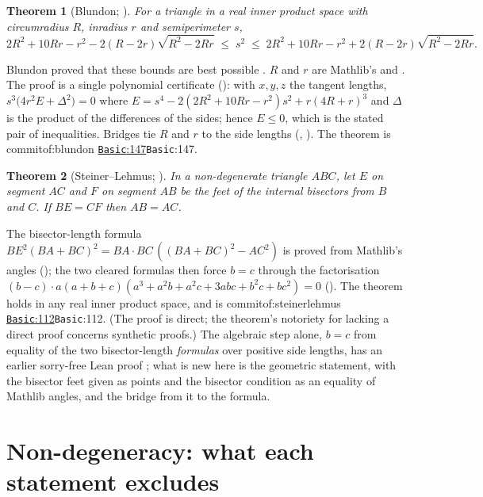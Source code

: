 \documentclass[11pt]{article}
\newtheorem{theorem}{Theorem}
\theoremstyle{definition}
\theoremstyle{remark}
\newcommand{\commitof}[1]{\csname commitof:#1\endcsname}
\newcommand{\repo}[1]{https://github.com/jpbald93/#1}
\newcommand{\src}[4]{\ifcsname commitof:#1\endcsname
  \href{\repo{#1}/blob/\commitof{#1}/#2/#3.lean\#L#4}{\texttt{#3}:#4}\else\texttt{#3}:#4\fi}
\begin{document}
\begin{theorem}[Blundon; ]\label{thm:blundon}
For a triangle in a real inner product space with circumradius $R$, inradius $r$ and semiperimeter $s$,
\[
2R^2+10Rr-r^2-2(R-2r)\sqrt{R^2-2Rr}\;\le\; s^2\;\le\;2R^2+10Rr-r^2+2(R-2r)\sqrt{R^2-2Rr}.
\]
\end{theorem}
Blundon proved that these bounds are best possible \cite{blundon1965}. $R$ and $r$ are Mathlib's
 and . The proof is a single
polynomial certificate (): with $x,y,z$ the tangent lengths,
$s^3\bigl(4r^2E+\Delta^2\bigr)=0$ where $E=s^4-2(2R^2+10Rr-r^2)s^2+r(4R+r)^3$ and $\Delta$ is the product
of the differences of the sides; hence $E\le 0$, which is the stated pair of inequalities. Bridges tie
$R$ and $r$ to the side lengths (, ).
The theorem is \src{blundon}{Blundon}{Basic}{147}.

\begin{theorem}[Steiner--Lehmus; ]\label{thm:steiner}
In a non-degenerate triangle $ABC$, let $E$ on segment $AC$ and $F$ on segment $AB$ be the feet of
the internal bisectors from $B$ and $C$. If $BE=CF$ then $AB=AC$.
\end{theorem}
The bisector-length formula $BE^2(BA+BC)^2 = BA\cdot BC\,((BA+BC)^2-AC^2)$ is proved from Mathlib's
angles (); the two cleared formulas then force $b=c$ through the
factorisation $(b-c)\cdot a(a+b+c)(a^3+a^2b+a^2c+3abc+b^2c+bc^2)=0$
(). The theorem holds in any real inner product space, and is
\src{steinerlehmus}{SteinerLehmus}{Basic}{112}. (The proof is direct; the theorem's notoriety for
lacking a direct proof \cite{gilbert1963,coxeter1967} concerns synthetic proofs.) The algebraic step
alone, $b=c$ from equality of the two bisector-length \emph{formulas} over positive side lengths, has
an earlier sorry-free Lean proof \cite{leangeniusSL}; what is new here is the geometric statement, with
the bisector feet given as points and the bisector condition as an equality of Mathlib angles, and the
bridge  from it to the formula.

\section{Non-degeneracy: what each statement excludes}\label{sec:degen}
\end{document}
